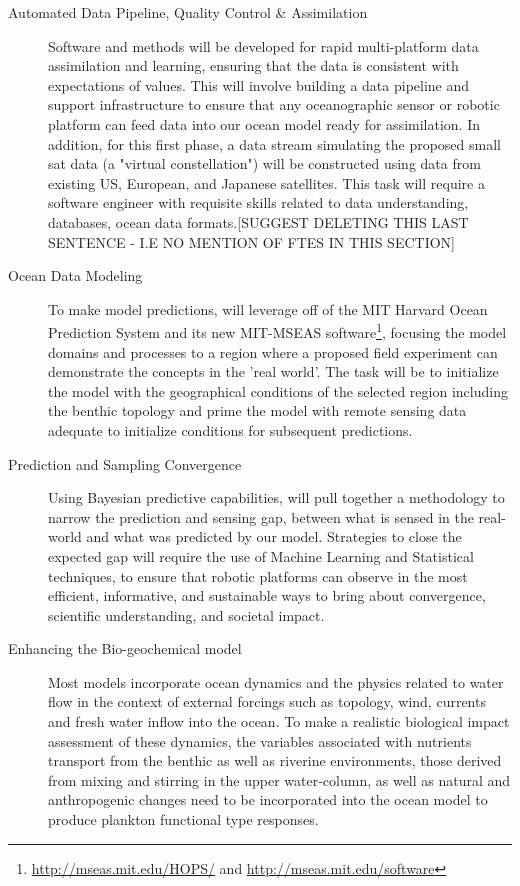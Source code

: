 \begin{description}

\item[Automated Data Pipeline, Quality Control \& Assimilation]
  Software and methods will be developed for rapid multi-platform data
  assimilation and learning, ensuring that the data is consistent with
  expectations of values. This will involve building a data pipeline
  and support infrastructure to ensure that any oceanographic sensor
  or robotic platform can feed data into our ocean model ready for
  assimilation. In addition, for this first phase, a data stream simulating the proposed small sat data (a "virtual constellation") will be constructed using data from existing US, European, and Japanese satellites. This task will require a software engineer with
  requisite skills related to data understanding, databases, ocean
  data formats.[SUGGEST DELETING THIS LAST SENTENCE - I.E NO MENTION OF FTES IN THIS SECTION]

\item[Ocean Data Modeling] To make model predictions, \pro will
  leverage off of the MIT Harvard Ocean Prediction System and its new
  MIT-MSEAS software\footnote{\url{http://mseas.mit.edu/HOPS/} and
    \url{http://mseas.mit.edu/software}}, focusing the model domains
  and processes to a region where a proposed field experiment can
  demonstrate the concepts in the 'real world'. The task will be to
  initialize the model with the geographical conditions of the
  selected region including the benthic topology and prime the model
  with remote sensing data adequate to initialize conditions for
  subsequent predictions.

\item[Prediction and Sampling Convergence] Using Bayesian predictive
  capabilities, \pro will pull together a methodology to narrow the
  prediction and sensing gap, between what is sensed in the real-world
  and what was predicted by our model. Strategies to close the
  expected gap will require the use of Machine Learning and
  Statistical techniques, to ensure that robotic platforms can observe
  in the most efficient, informative, and sustainable ways to bring
  about convergence, scientific understanding, and societal impact.

\item[Enhancing the Bio-geochemical model] Most models incorporate ocean
  dynamics and the physics related to water flow in the context of
  external forcings such as topology, wind, currents and fresh water
  inflow into the ocean. To make a realistic biological impact
  assessment of these dynamics, the variables associated with nutrients
  transport from the benthic as well as riverine environments, those
  derived from mixing and stirring in the upper water-column, as well as
  natural and anthropogenic changes need to be incorporated into the
  ocean model to produce plankton functional type responses. 


\end{description}
